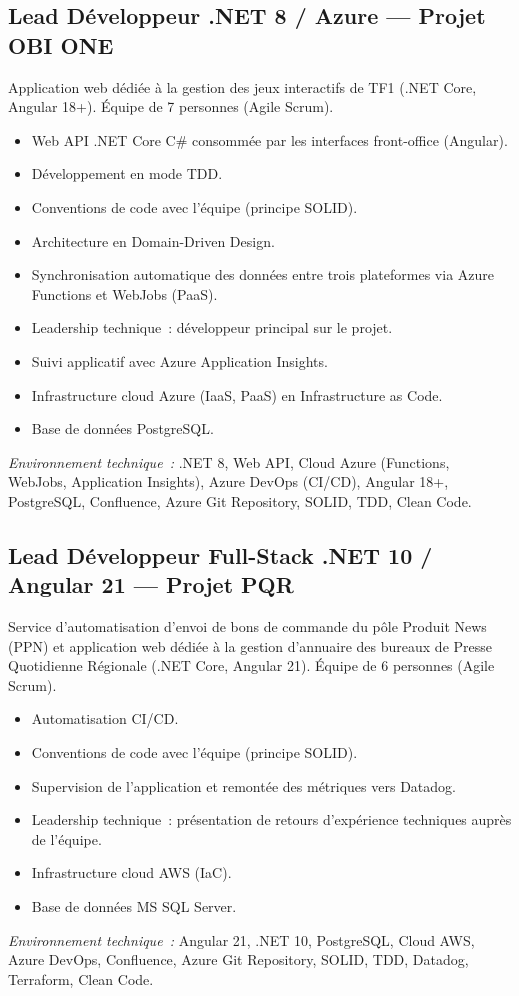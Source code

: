 \documentclass[10pt,a4paper]{article}
\begin{document}
\subsection*{Lead Développeur .NET 8 / Azure --- Projet OBI ONE}
\color{darkgray}
Application web dédiée à la gestion des jeux interactifs de TF1 (.NET Core, Angular 18+). Équipe de 7 personnes (Agile Scrum).
\begin{itemize}
  \item Web API .NET Core C\# consommée par les interfaces front-office (Angular).
  \item Développement en mode TDD.
  \item Conventions de code avec l'équipe (principe SOLID).
  \item Architecture en Domain-Driven Design.
  \item Synchronisation automatique des données entre trois plateformes via Azure Functions et WebJobs (PaaS).
  \item Leadership technique~: développeur principal sur le projet.
  \item Suivi applicatif avec Azure Application Insights.
  \item Infrastructure cloud Azure (IaaS, PaaS) en Infrastructure as Code.
  \item Base de données PostgreSQL.
\end{itemize}
\textit{Environnement technique~:} .NET 8, Web API, Cloud Azure (Functions, WebJobs, Application Insights), Azure DevOps (CI/CD), Angular 18+, PostgreSQL, Confluence, Azure Git Repository, SOLID, TDD, Clean Code.

\vspace{6pt}

\subsection*{Lead Développeur Full-Stack .NET 10 / Angular 21 --- Projet PQR}
\color{darkgray}
Service d'automatisation d'envoi de bons de commande du pôle Produit News (PPN) et application web dédiée à la gestion d'annuaire des bureaux de Presse Quotidienne Régionale (.NET Core, Angular 21). Équipe de 6 personnes (Agile Scrum).
\begin{itemize}
  \item Automatisation CI/CD.
  \item Conventions de code avec l'équipe (principe SOLID).
  \item Supervision de l'application et remontée des métriques vers Datadog.
  \item Leadership technique~: présentation de retours d'expérience techniques auprès de l'équipe.
  \item Infrastructure cloud AWS (IaC).
  \item Base de données MS SQL Server.
\end{itemize}
\textit{Environnement technique~:} Angular 21, .NET 10, PostgreSQL, Cloud AWS, Azure DevOps, Confluence, Azure Git Repository, SOLID, TDD, Datadog, Terraform, Clean Code.
\end{document}
